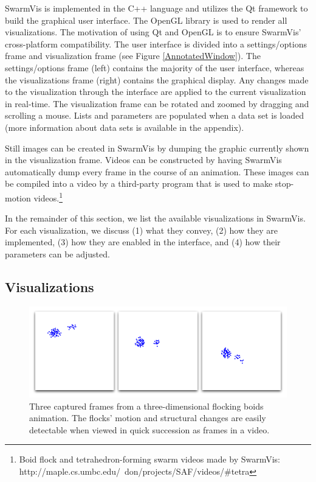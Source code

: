 \documentclass{vgtc}
\begin{document}
SwarmVis is implemented in the C++ language and utilizes the Qt framework\cite{Qt:website} to build the graphical user interface.
The OpenGL library is used to render all visualizations.
The motivation of using Qt and OpenGL is to ensure SwarmVis' cross-platform compatibility.
The user interface is divided into a settings/options frame and visualization frame (see Figure \ref{AnnotatedWindow}).
The settings/options frame (left) contains the majority of the user interface,
whereas the visualizations frame (right) contains  the graphical display.
Any changes made to the visualization through the interface are applied to the current visualization in real-time.
The visualization frame can be rotated and zoomed by dragging and scrolling a mouse.
Lists and parameters are populated when a data set is loaded (more information about data sets is available in the appendix).

Still images can be created in SwarmVis by dumping the graphic currently shown in the visualization frame.
Videos can be constructed by having SwarmVis automatically dump every frame in the course of an animation.
These images can be compiled into a video by a third-party program that is used to make stop-motion
videos.\footnote{Boid flock and tetrahedron-forming swarm videos made by SwarmVis:\\
 http://maple.cs.umbc.edu/~don/projects/SAF/videos/\#tetra}

In the remainder of this section, we list the available visualizations in SwarmVis.
For each visualization, we discuss
(1) what they convey,
(2) how they are implemented,
(3) how they are enabled in the interface,
and (4) how their parameters can be adjusted.


\subsection{Visualizations}\label{visualizations}


\begin{figure}
\centering
\includegraphics[scale=.282]{images/animation.png}
\caption{
Three captured frames from a three-dimensional flocking boids\cite{reynolds1987} animation.
The flocks' motion and structural changes are easily detectable when viewed in quick succession as frames in a video.}
\label{Animation}
\end{figure}
\end{document}
